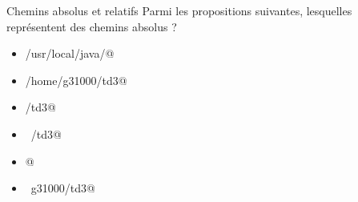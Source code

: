 \documentclass[a4paper,11pt]{article}
\begin{document}
		\begin{Exercice}{Chemins absolus et relatifs} 
            		Parmi les propositions suivantes, lesquelles repr\'esentent des chemins absolus ?
           		 \begin{itemize} 
        
           			 \item[ \ding{"6F} ] \verb@/usr/local/java/@
        
           			 \item[ \ding{"6F} ] \verb@/home/g31000/td3@
        
           			 \item[ \ding{"6F} ] /td3@
        
           			 \item[ \ding{"6F} ] \verb@~/td3@
        
           			 \item[ \ding{"6F} ] @
        
          			  \item[ \ding{"6F} ] \verb@~g31000/td3@
        
           		 \end{itemize} 
		 \end{Exercice}
%			
%		
%						
%        
%        
%        
\end{document}
